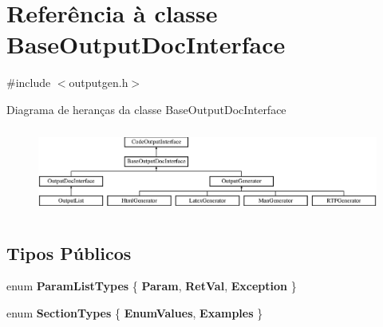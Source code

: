 \hypertarget{class_base_output_doc_interface}{\section{Referência à classe Base\-Output\-Doc\-Interface}
\label{class_base_output_doc_interface}
}


{\ttfamily \#include $<$outputgen.\-h$>$}

Diagrama de heranças da classe Base\-Output\-Doc\-Interface\begin{figure}[H]
\begin{center}
\leavevmode
\includegraphics[height=2.835443cm]{class_base_output_doc_interface}
\end{center}
\end{figure}
\subsection*{Tipos Públicos}
\begin{DoxyCompactItemize}
\item 
enum {\bfseries Param\-List\-Types} \{ {\bfseries Param}, 
{\bfseries Ret\-Val}, 
{\bfseries Exception}
 \}
\item 
enum {\bfseries Section\-Types} \{ {\bfseries Enum\-Values}, 
{\bfseries Examples}
 \}
\end{DoxyCompactItemize}
